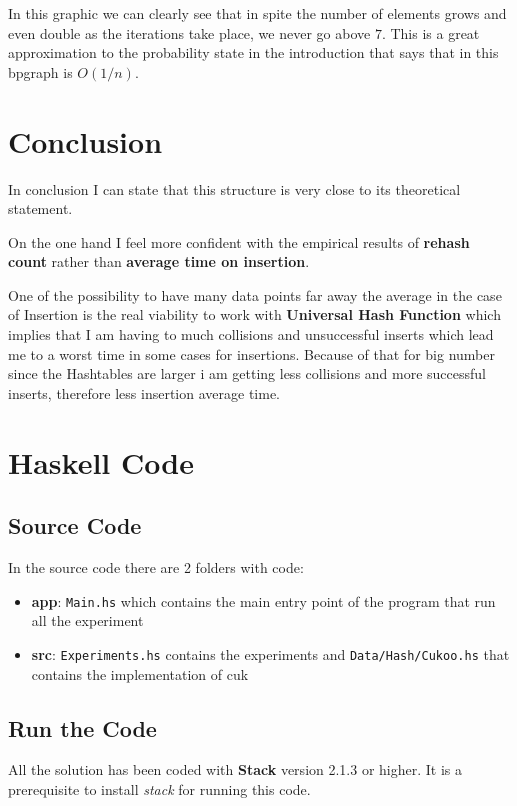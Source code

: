 \documentclass[12pt, a4paper]{article}
\begin{document}
In this graphic we can clearly see that in spite the number of elements grows and even double as the iterations take place, we never go above $7$. This is a great approximation to the probability state in the introduction that says that in this \acrshort{bpgraph} is $O(1/n)$.

\section{Conclusion}
In conclusion I can state that this structure is very close to its theoretical statement.

On the one hand I feel more confident with the empirical results of \textbf{rehash count} rather than \textbf{average time on insertion}.

One of the possibility to have many data points far away the average in the case of Insertion is the real viability to work with \textbf{Universal Hash Function} which implies that I am having to much collisions and unsuccessful inserts which lead me to a worst time in some cases for insertions. Because of that for big number since the Hashtables are larger i am getting less collisions and more successful inserts, therefore less insertion average time.


\appendix\label{appendix}
\section{Haskell Code}
\subsection{Source Code}
In the source code there are 2 folders with code:

\begin{itemize}
  \item \textbf{app}: \texttt{Main.hs} which contains the main entry point of the program that run all the experiment
  \item \textbf{src}: \texttt{Experiments.hs} contains the experiments and \texttt{Data/Hash/Cukoo.hs} that contains the implementation of \acrshort{cuk}
\end{itemize}

\subsection{Run the Code}
All the solution has been coded with \textbf{Stack} \cite{stack} version 2.1.3 or higher. It is a prerequisite to install \textit{stack} for running this code.
\end{document}
